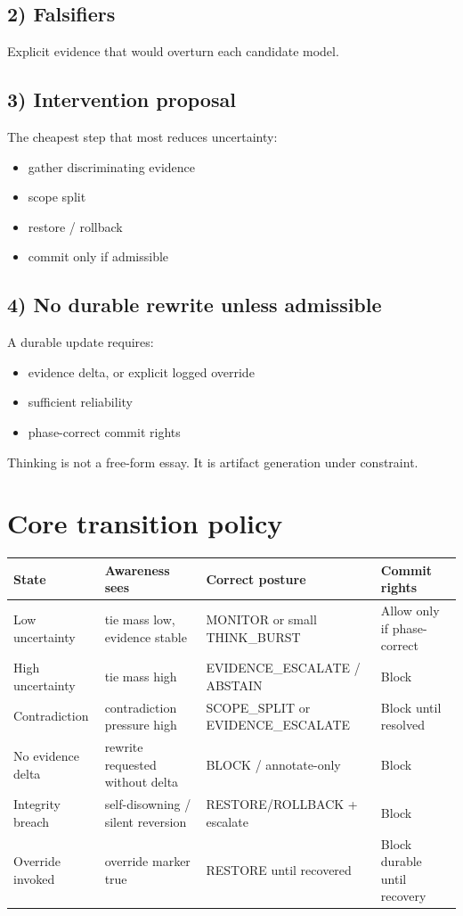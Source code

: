 \documentclass[11pt]{article}
\begin{document}
\subsection*{2) Falsifiers}
Explicit evidence that would overturn each candidate model.

\subsection*{3) Intervention proposal}
The cheapest step that most reduces uncertainty:
\begin{itemize}[leftmargin=2em]
  \item gather discriminating evidence
  \item scope split
  \item restore / rollback
  \item commit only if admissible
\end{itemize}

\subsection*{4) No durable rewrite unless admissible}
A durable update requires:
\begin{itemize}[leftmargin=2em]
  \item evidence delta, or explicit logged override
  \item sufficient reliability
  \item phase-correct commit rights
\end{itemize}

Thinking is not a free-form essay. It is artifact generation under constraint.

\section{Core transition policy}
\renewcommand{\arraystretch}{1.2}
\begin{longtable}{|p{}|p{}|p{}|p{}|}
\hline
\textbf{State} & \textbf{Awareness sees} & \textbf{Correct posture} & \textbf{Commit rights} \\
\hline
Low uncertainty & tie mass low, evidence stable & MONITOR or small THINK\_BURST & Allow only if phase-correct \\
\hline
High uncertainty & tie mass high & EVIDENCE\_ESCALATE / ABSTAIN & Block \\
\hline
Contradiction & contradiction pressure high & SCOPE\_SPLIT or EVIDENCE\_ESCALATE & Block until resolved \\
\hline
No evidence delta & rewrite requested without delta & BLOCK / annotate-only & Block \\
\hline
Integrity breach & self-disowning / silent reversion & RESTORE/ROLLBACK + escalate & Block \\
\hline
Override invoked & override marker true & RESTORE until recovered & Block durable until recovery \\
\hline
\end{longtable}
\end{document}
